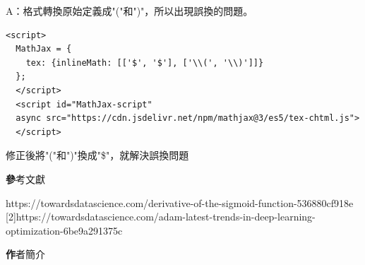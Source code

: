 \documentclass[14pt,a4paper]{report}  %
\begin{document}
A：格式轉換原始定義成"("和")"，所以出現誤換的問題。\\
\begin{lstlisting}
<script>
  MathJax = {
    tex: {inlineMath: [['$', '$'], ['\\(', '\\)']]}
  };
  </script>
  <script id="MathJax-script" 
  async src="https://cdn.jsdelivr.net/npm/mathjax@3/es5/tex-chtml.js"> 
  </script>
\end{lstlisting}
修正後將"("和")"換成"\$"，就解決誤換問題
\newpage
\begin{center}
\LARGE\textbf 參考文獻\\
\end{center}
\begin{flushleft}
\begin{Large}
[1]\quad https://towardsdatascience.com/derivative-of-the-sigmoid-function-536880cf918e\\

[2]\quad https://towardsdatascience.com/adam-latest-trends-in-deep-learning-optimization-6be9a291375c\\
\end{Large}
\end{flushleft}
\newpage
\begin{center}
\LARGE\textbf 作者簡介\\
\end{center}

\end{document}

